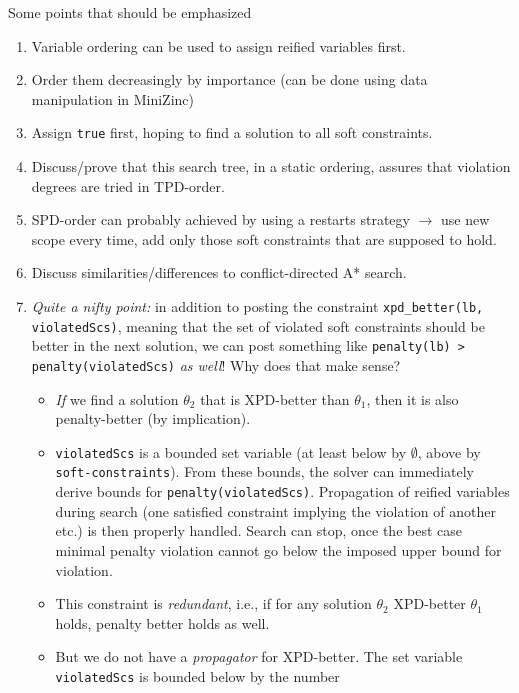 



Some points that should be emphasized 

\begin{enumerate}
\item Variable ordering can be used to assign reified variables first.
\item Order them decreasingly by importance (can be done using data manipulation in MiniZinc)
\item Assign \texttt{true} first, hoping to find a solution to all soft constraints.
\item Discuss/prove that this search tree, in a static ordering, assures that violation degrees
are tried in TPD-order.
\item SPD-order can probably achieved by using a restarts strategy $\rightarrow$ use new scope 
every time, add only those soft constraints that are supposed to hold.
\item Discuss similarities/differences to conflict-directed A* search.
\item \emph{Quite a nifty point:} in addition to posting the constraint 
\texttt{xpd\_better(lb, violatedScs)}, meaning that the set of violated soft constraints should
be better in the next solution, we can post something like \texttt{penalty(lb) > penalty(violatedScs)}
\emph{as well}! Why does that make sense?
\begin{itemize}
\item \emph{If} we find a solution $\theta_2$ that is XPD-better than $\theta_1$, then it is also penalty-better (by implication).
\item \texttt{violatedScs} is a bounded set variable (at least below by $\emptyset$, above by \texttt{soft-constraints}).
From these bounds, the solver can immediately derive bounds for \texttt{penalty(violatedScs)}. Propagation of reified variables
during search (one satisfied constraint implying the violation of another etc.) is then properly handled. Search can stop,
once the best case minimal penalty violation cannot go below the imposed upper bound for violation.
\item This constraint is \emph{redundant}, i.e., if for any solution $\theta_2$ XPD-better $\theta_1$ holds, penalty better holds
as well.
\item But we do not have a \emph{propagator} for XPD-better. The set variable \texttt{violatedScs} is bounded below by the number

\end{itemize}
\end{enumerate}

